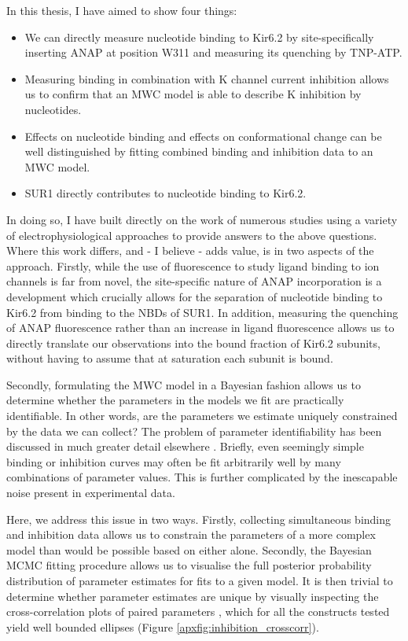In this thesis, I have aimed to show four things:
\begin{itemize}
\item We can directly measure nucleotide binding to Kir6.2 by site-specifically inserting ANAP at position W311 and measuring its quenching by TNP-ATP.
\item Measuring binding in combination with K\ATP{} channel current inhibition allows us to confirm that an MWC model is able to describe K\ATP{} inhibition by nucleotides.
\item Effects on nucleotide binding and effects on conformational change can be well distinguished by fitting combined binding and inhibition data to an MWC model.
\item SUR1 directly contributes to nucleotide binding to Kir6.2.
\end{itemize}

In doing so, I have built directly on the work of numerous studies using a variety of electrophysiological approaches to provide answers to the above questions.
Where this work differs, and - I believe - adds value, is in two aspects of the approach.
Firstly, while the use of fluorescence to study ligand binding to ion channels is far from novel, the site-specific nature of ANAP incorporation is a development which crucially allows for the separation of nucleotide binding to Kir6.2 from binding to the NBDs of SUR1.
In addition, measuring the quenching of ANAP fluorescence rather than an increase in ligand fluorescence allows us to directly translate our observations into the bound fraction of Kir6.2 subunits, without having to assume that at saturation each subunit is bound.

Secondly, formulating the MWC model in a Bayesian fashion allows us to determine whether the parameters in the models we fit are practically identifiable.
In other words, are the parameters we estimate uniquely constrained by the data we can collect?
The problem of parameter identifiability has been discussed in much greater detail elsewhere \cite{calderhead_bayesian_2013, hines_determination_2014-1, hines_primer_2015, middendorf_structural_2016}.
Briefly, even seemingly simple binding or inhibition curves may often be fit arbitrarily well by many combinations of parameter values.
This is further complicated by the inescapable noise present in experimental data.

Here, we address this issue in two ways.
Firstly, collecting simultaneous binding and inhibition data allows us to constrain the parameters of a more complex model than would be possible based on either alone.
Secondly, the Bayesian MCMC fitting procedure allows us to visualise the full posterior probability distribution of parameter estimates for fits to a given model.
It is then trivial to determine whether parameter estimates are unique by visually inspecting the cross-correlation plots of paired parameters \cite{hines_determination_2014-1}, which for all the constructs tested yield well bounded ellipses (Figure \ref{apxfig:inhibition_crosscorr}).

